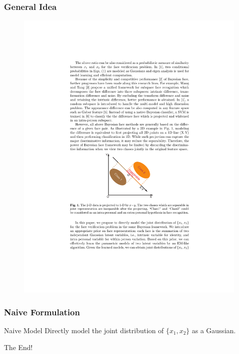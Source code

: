 \documentclass{beamer}
\begin{document}
\begin{frame}
\frametitle{General Idea}
\begin{figure}[H]
\centering
\includegraphics[height=\textheight, trim=3.25in 3.4in 3.25in 5.4in, clip]{Chen2}
\end{figure}
\end{frame}

\begin{frame}
\frametitle{Naive Formulation}
\begin{block}{Naive Model}
Directly model the joint distribution of $\{x_1,x_2\}$ as a Gaussian.
\end{block}
\end{frame}

\begin{frame}
\centerline{The End!}
\end{frame}

\end{document}
